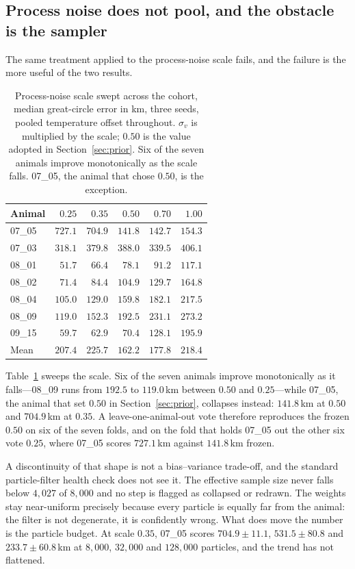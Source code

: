 \documentclass[conference]{IEEEtran}
\begin{document}
\subsection{Process noise does not pool, and the obstacle is the sampler}
The same treatment applied to the process-noise scale fails, and the failure is
the more useful of the two results.

\begin{table}[t]
\caption{Process-noise scale swept across the cohort, median great-circle error
in \si{\km}, three seeds, pooled temperature offset throughout. $\sigma_v$ is
multiplied by the scale; $0.50$ is the value adopted in Section~\ref{sec:prior}.
Six of the seven animals improve monotonically as the scale falls. 07\_05, the
animal that chose $0.50$, is the exception.}
\label{tab:scale}
\centering
\small
\begin{tabular}{@{}lrrrrr@{}}
\toprule
Animal & $0.25$ & $0.35$ & $0.50$ & $0.70$ & $1.00$ \\
\midrule
07\_05 & $727.1$ & $704.9$ & $141.8$ & $142.7$ & $154.3$ \\
07\_03 & $318.1$ & $379.8$ & $388.0$ & $339.5$ & $406.1$ \\
08\_01 & $51.7$  & $66.4$  & $78.1$  & $91.2$  & $117.1$ \\
08\_02 & $71.4$  & $84.4$  & $104.9$ & $129.7$ & $164.8$ \\
08\_04 & $105.0$ & $129.0$ & $159.8$ & $182.1$ & $217.5$ \\
08\_09 & $119.0$ & $152.3$ & $192.5$ & $231.1$ & $273.2$ \\
09\_15 & $59.7$  & $62.9$  & $70.4$  & $128.1$ & $195.9$ \\
\midrule
Mean   & $207.4$ & $225.7$ & $162.2$ & $177.8$ & $218.4$ \\
\bottomrule
\end{tabular}
\end{table}

Table~\ref{tab:scale} sweeps the scale. Six of the seven animals improve
monotonically as it falls---08\_09 runs from $192.5$ to $119.0$\,\si{\km}
between $0.50$ and $0.25$---while 07\_05, the animal that set $0.50$ in
Section~\ref{sec:prior}, collapses instead: $141.8$\,\si{\km} at $0.50$ and
$704.9$\,\si{\km} at $0.35$. A leave-one-animal-out vote therefore reproduces
the frozen $0.50$ on six of the seven folds, and on the fold that holds 07\_05
out the other six vote $0.25$, where 07\_05 scores $727.1$\,\si{\km} against
$141.8$\,\si{\km} frozen.

A discontinuity of that shape is not a bias--variance trade-off, and the
standard particle-filter health check does not see it. The effective sample size
never falls below $4{,}027$ of $8{,}000$ and no step is flagged as collapsed or
redrawn. The weights stay near-uniform precisely because every particle is
equally far from the animal: the filter is not degenerate, it is confidently
wrong. What does move the number is the particle budget. At scale $0.35$, 07\_05
scores $704.9 \pm 11.1$, $531.5 \pm 80.8$ and $233.7 \pm 60.8$\,\si{\km} at
$8{,}000$, $32{,}000$ and $128{,}000$ particles, and the trend has not
flattened.
\end{document}
